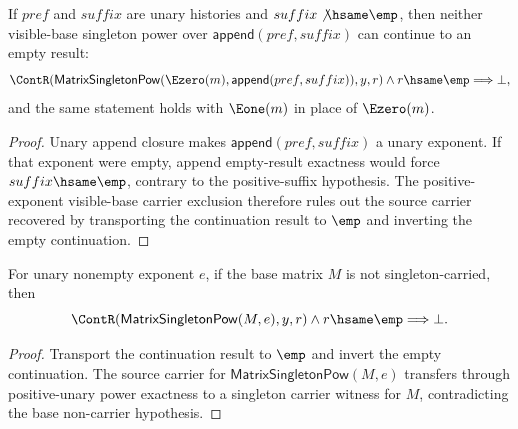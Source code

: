 \begin{theorem}
\label{thm:matrix-singleton-pow-visible-base-append-positive-suffix-continuation-empty-result-absurd}
If $pref$ and $suffix$ are unary histories and $suffix\not\hsame\emp$, then
neither visible-base singleton power over $\mathsf{append}(pref,suffix)$ can
continue to an empty result:
$$
\ContR(\mathsf{MatrixSingletonPow}(\Ezero(m),\mathsf{append}(pref,suffix)),y,r)
\land r\hsame\emp\Longrightarrow\bot,
$$
and the same statement holds with $\Eone(m)$ in place of $\Ezero(m)$.
\end{theorem}
\begin{proof}
Unary append closure makes $\mathsf{append}(pref,suffix)$ a unary exponent.
If that exponent were empty, append empty-result exactness would force
$suffix\hsame\emp$, contrary to the positive-suffix hypothesis. The
positive-exponent visible-base carrier exclusion therefore rules out the source
carrier recovered by transporting the continuation result to $\emp$ and
inverting the empty continuation.
\end{proof}

\begin{theorem}
\label{thm:matrix-singleton-pow-nonempty-base-continuation-result-absurd}
For unary nonempty exponent $e$, if the base matrix $M$ is not singleton-carried, then
$$
\ContR(\mathsf{MatrixSingletonPow}(M,e),y,r)\land r\hsame\emp\Longrightarrow\bot.
$$
\end{theorem}
\begin{proof}
Transport the continuation result to $\emp$ and invert the empty continuation. The source carrier for $\mathsf{MatrixSingletonPow}(M,e)$ transfers through positive-unary power exactness to a singleton carrier witness for $M$, contradicting the base non-carrier hypothesis.
\end{proof}


